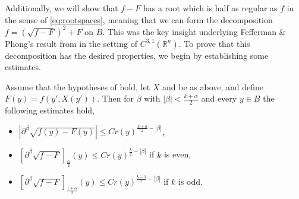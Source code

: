 \documentclass[oneside,hidelinks,indentfirst,10pt]{book}
\begin{document}
Additionally, we will show that \(f-F\) has a root which is half as regular as \(f\) in the sense of \eqref{eq:rootspaces}, meaning that we can form the decomposition \(f=(\sqrt{f-F})^2+F\) on \(B\). This was the key insight underlying Fefferman \& Phong's result from \cite{Fefferman-Phong} in the setting of \(C^{3,1}(\mathbb{R}^n)\). To prove that this decomposition has the desired properties, we begin by establishing some estimates.


\begin{lem}\label{lem:nice}
Assume that the hypotheses of  hold, let \(X\) and be as above, and define \(F(y)=f(y',X(y'))\). Then for \(\beta\) with \(|\beta|<\frac{k+\alpha}{2}\) and every \(y\in B\) the following estimates hold,
\begin{itemize}
    \item[(1)] \(|\partial^\beta\sqrt{f(y)-F(y)}|\leq Cr(y)^{\frac{k+\alpha}{2}-|\beta|}\),
    \item[(2)] \([\partial^\beta\sqrt{f-F}]_{\frac{\alpha}{2}}(y)\leq Cr(y)^{\frac{k}{2}-|\beta|}\) if \(k\) is even,
    \item[(3)] \([\partial^\beta\sqrt{f-F}]_{\frac{1+\alpha}{2}}(y)\leq Cr(y)^{\frac{k-1}{2}-|\beta|}\) if \(k\) is odd.
\end{itemize}
\end{lem}
\end{document}
